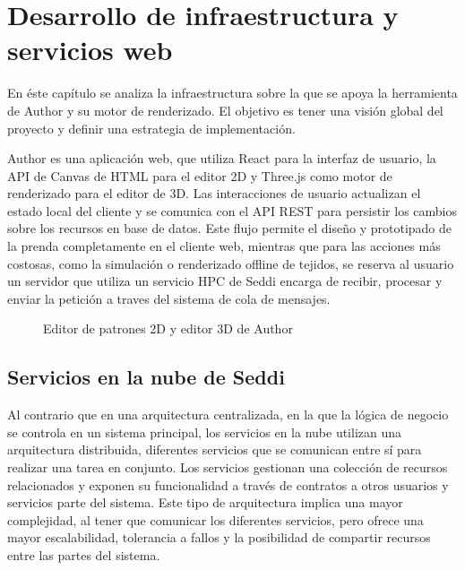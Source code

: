 \chapter{Desarrollo de infraestructura y servicios web}

  En \'este cap\'itulo se analiza la infraestructura sobre la que se apoya la herramienta de Author y su motor de
  renderizado. El objetivo es tener una visi\'on global del proyecto y definir una estrategia de implementaci\'on.

  Author es una aplicaci\'on web, que utiliza React para la interfaz de usuario, la API de
  Canvas de HTML para el editor 2D y Three.js como motor de renderizado para el editor de 3D. Las interacciones de
  usuario actualizan el estado local del cliente y se comunica con el API REST para persistir los cambios sobre
  los recursos en base de datos. Este flujo permite el dise\~no y prototipado de la prenda completamente en el
  cliente web, mientras que para las acciones m\'as costosas, como la simulaci\'on o renderizado offline de tejidos,
  se reserva al usuario un servidor que utiliza un servicio HPC de Seddi encarga de recibir, procesar y enviar la
  petici\'on a traves del sistema de cola de mensajes.

  \begin{figure}[H]
    \vspace{1cm}
    \centering
    \caption{Editor de patrones 2D y editor 3D de Author}
    \vspace{0.5cm}
  \end{figure}

  \section{Servicios en la nube de Seddi}

  \bgroup

    Al contrario que en una arquitectura centralizada, en la que la l\'ogica de negocio se controla en un sistema
    principal, los servicios en la nube utilizan una arquitectura distribuida, diferentes servicios que se comunican
    entre s\'i para realizar una tarea en conjunto. Los servicios gestionan una colecci\'on de recursos relacionados
    y exponen su funcionalidad a trav\'es de contratos a otros usuarios y servicios parte del sistema. Este tipo de
    arquitectura implica una mayor complejidad, al tener que comunicar los diferentes servicios, pero ofrece una
    mayor escalabilidad, tolerancia a fallos y la posibilidad de compartir recursos entre las partes del sistema.

